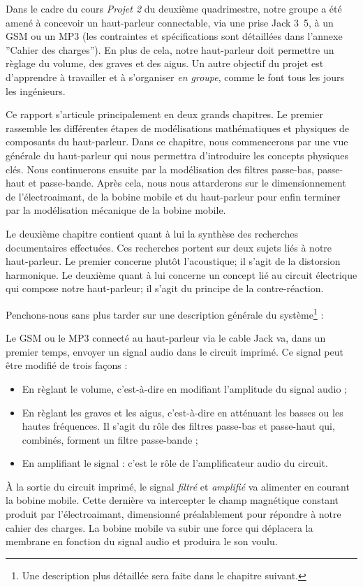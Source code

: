 

Dans le cadre du cours \textit{Projet 2} du deuxième quadrimestre, notre groupe a été amené à 
concevoir un haut-parleur connectable, via une prise Jack \unit{3.5}{\milli\meter}, à un 
GSM ou un MP3 (les contraintes et spécifications sont détaillées dans l'annexe ''Cahier des charges''). 
En plus de cela, notre haut-parleur doit permettre un règlage du volume, des graves
et des aigus. Un autre objectif du projet est d'apprendre à travailler et à s'organiser \textit{en groupe}, 
comme le font tous les jours les ingénieurs.

Ce rapport s'articule principalement en deux grands chapitres. Le premier
rassemble les différentes étapes de modélisations mathématiques
et physiques de composants du haut-parleur. Dans ce chapitre, nous 
commencerons par une vue générale du haut-parleur qui nous
permettra d'introduire les concepts physiques clés. Nous continuerons
ensuite par la modélisation des filtres passe-bas, passe-haut et passe-bande.
Après cela, nous nous attarderons  sur le dimensionnement de l'électroaimant, de la bobine mobile et du haut-parleur pour enfin terminer par la modélisation mécanique de la bobine
mobile.

Le deuxième chapitre contient quant à lui la synthèse des recherches documentaires
effectuées. Ces recherches portent sur deux sujets liés à notre haut-parleur. Le premier
concerne plutôt l'acoustique; il s'agit de la 
distorsion harmonique. Le deuxième quant à lui concerne un concept lié au circuit électrique qui
compose notre haut-parleur; il s'agit du principe de la contre-réaction.

Penchons-nous sans plus tarder sur une description générale du système\footnote{Une
description plus détaillée sera faite dans le chapitre suivant.} :

Le GSM ou le MP3 connecté au haut-parleur via le cable Jack va, dans un premier temps, envoyer un signal audio dans le 
circuit imprimé. Ce signal peut être modifié de trois façons :

\begin{itemize}
	\item En règlant le volume, c'est-à-dire en modifiant l'amplitude du signal audio ;
	\item En règlant les graves et les aigus, c'est-à-dire en atténuant les basses ou les hautes
	fréquences. Il s'agit du rôle des filtres passe-bas et passe-haut qui, combinés, forment un filtre 
	passe-bande ;
 \item En amplifiant le signal : c'est le rôle de l'amplificateur audio du circuit.
\end{itemize}
 
À la sortie du circuit imprimé, le signal \textit{filtré} et \textit{amplifié} va alimenter en courant la bobine mobile.
Cette dernière va intercepter le champ magnétique constant produit par l'électroaimant, dimensionné préalablement
pour répondre à notre cahier des charges. La bobine mobile va subir une force qui déplacera la membrane en fonction
du signal audio et produira le son voulu.


